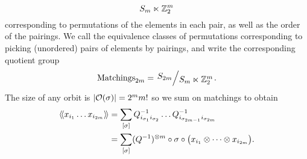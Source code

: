 \begin{equation*}
  S_m \ltimes \mathbb{Z}_2^m
\end{equation*}
corresponding to permutations of the elements in each pair, as well as the order of the pairings. We call the equivalence classes of permutations corresponding to picking (unordered) pairs of elements by pairings, and write the corresponding quotient group
\begin{equation*}
  \text{Matchings}_{2m} = \bigslant{S_{2m}}{S_m \ltimes \Zbb_2^m}.
\end{equation*}
The size of any orbit is $| \mathcal{O} (\sigma) | = 2^m m!$ so we sum on matchings to obtain
\begin{align*}
  \langle \! \langle {x_{i_1} \dots x_{i_{2m}}} \rangle \! \rangle
  &= \sum_{[\sigma]}
  Q_{i_{\sigma_1} i_{\sigma_2}}^{-1} \dots Q_{i_{\sigma_{2m-1}} i_{\sigma_{2m}}}^{-1} \\
  &= \sum_{[\sigma]} (Q^{-1})^{\otimes m} \circ \sigma \circ \bigl(x_{i_1} \otimes \dots \otimes x_{i_{2m}}\bigr).
\end{align*}


